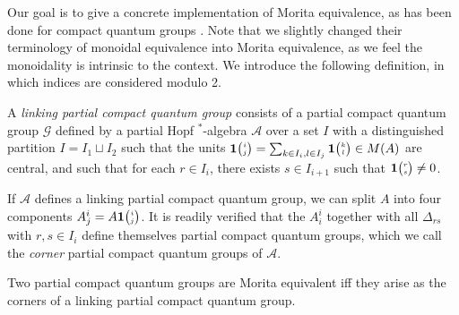 Our goal is to give a concrete implementation of Morita equivalence, as has been done for compact quantum groups \cite{BDV1}. Note that we slightly changed their terminology of monoidal equivalence into Morita equivalence, as we feel the monoidality is intrinsic to the context. We introduce the following definition, in which indices are considered modulo 2. 

\begin{Def} A \emph{linking partial compact quantum group} consists of a partial compact quantum group $\mathscr{G}$ defined by a partial Hopf $^*$-algebra $\mathscr{A}$ over a set $I$ with a distinguished partition $I = I_1\sqcup I_2$ such that the units $\mathbf{1}{\tiny {\begin{pmatrix} i\\j\end{pmatrix}}} = \sum_{k\in I_i,l\in I_j} \mathbf{1}{\tiny {\begin{pmatrix} k\\l\end{pmatrix}}} \in M(A)$ are central, and such that for each $r\in I_i$, there exists $s\in I_{i+1}$ such that $\mathbf{1}{\tiny {\begin{pmatrix} r\\s\end{pmatrix}}}\neq 0$.
\end{Def}

If $\mathscr{A}$ defines a linking partial compact quantum group, we can split $A$ into four components $A^i_j = A\mathbf{1}{\tiny {\begin{pmatrix} i\\j\end{pmatrix}}}$. It is readily verified that the $A^i_i$ together with all $\Delta_{rs}$ with $r,s \in I_i$ define themselves partial compact quantum groups, which we call the \emph{corner} partial compact quantum groups of $\mathscr{A}$. 

\begin{Prop} Two partial compact quantum groups are Morita equivalent iff they arise as the corners of a linking partial compact quantum group.
\end{Prop}

